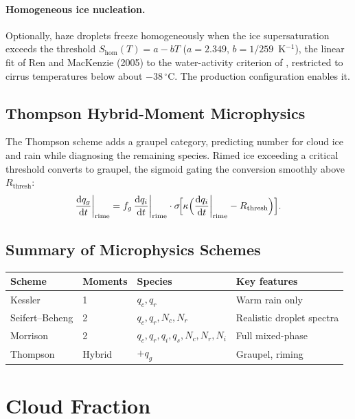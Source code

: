 \documentclass[11pt,twoside]{report}
\newcommand{\dd}{\mathrm{d}}
\begin{document}
\paragraph{Homogeneous ice nucleation.}
Optionally, haze droplets freeze homogeneously when the ice supersaturation
exceeds the threshold
$S_{\mathrm{hom}}(T)=a-bT$ ($a=2.349$, $b=1/259$~K$^{-1}$), the
linear fit of Ren and MacKenzie (2005) to the water-activity criterion of
\citet{Koop2000}, restricted to cirrus temperatures below about
$-38\,^\circ$C.  The production configuration enables it.

\subsection{Thompson Hybrid-Moment Microphysics}

The Thompson scheme \citep{Thompson2008} adds a graupel category, predicting
number for cloud ice and rain while diagnosing the remaining species. Rimed
ice exceeding a critical threshold converts to graupel, the sigmoid gating
the conversion smoothly above $R_{\mathrm{thresh}}$:
\begin{equation}
  \frac{\dd q_g}{\dd t}\bigg|_{\mathrm{rime}}
  = f_g\,\frac{\dd q_i}{\dd t}\bigg|_{\mathrm{rime}}
  \cdot\sigma\!\Bigl[\kappa\Bigl(\frac{\dd q_i}{\dd t}\bigg|_{\mathrm{rime}}
  - R_{\mathrm{thresh}}\Bigr)\Bigr].
\end{equation}

\subsection{Summary of Microphysics Schemes}

\begin{center}
\begin{tabular}{lllp{5cm}}
\toprule
Scheme & Moments & Species & Key features \\
\midrule
Kessler & 1 & $q_c,q_r$ & Warm rain only \\
Seifert--Beheng & 2 & $q_c,q_r,N_c,N_r$ & Realistic droplet spectra \\
Morrison & 2 & $q_c,q_r,q_i,q_s,N_c,N_r,N_i$ & Full mixed-phase \\
Thompson & Hybrid & $+q_g$ & Graupel, riming \\
\bottomrule
\end{tabular}
\end{center}


\section{Cloud Fraction}
\label{sec:clouds}
\end{document}
